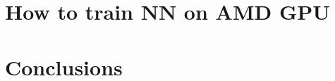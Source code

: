 \documentclass{article}
\begin{document}
\section{How to train NN on AMD GPU}
\label{sec:AMD}


\section{Conclusions}
\label{sec:end}



%





\end{document}
